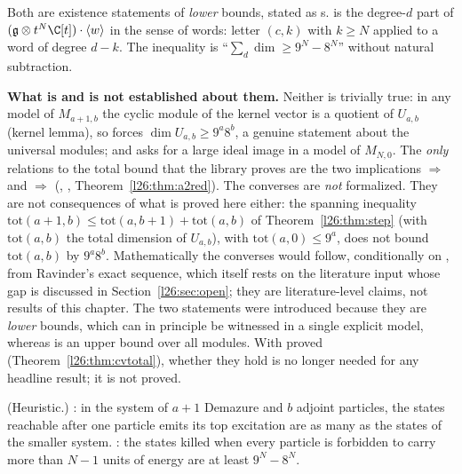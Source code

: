 \begin{dictionary}
Both are existence statements of \emph{lower} bounds, stated as s.  is the degree-$d$ part
of $(\ltwentysixg\otimes t^N\C[t])\cdot\langle w\rangle$ in the sense of words: letter $(c,k)$ with $k\ge N$ applied to a word of
degree $d-k$. The inequality  is ``$\sum_d\dim\ge9^N-8^N$'' without natural subtraction.

\textbf{What is and is not established about them.} Neither is trivially true: in any model of $M_{a+1,b}$ the cyclic
module of the kernel vector is a quotient of $U_{a,b}$ (kernel lemma), so  forces
$\dim U_{a,b}\ge9^a8^b$, a genuine statement about the universal modules; and  asks for a large ideal image
in a model of $M_{N,0}$. The \emph{only} relations to the total bound that the library proves are the two implications
 $\Rightarrow$  and  $\Rightarrow$ 
(, , Theorem~\ref{l26:thm:a2red}). The converses are
\emph{not} formalized. They are not consequences of what is proved here either: the spanning inequality
$\mathrm{tot}(a+1,b)\le\mathrm{tot}(a,b+1)+\mathrm{tot}(a,b)$ of Theorem~\ref{l26:thm:step} (with $\mathrm{tot}(a,b)$ the total dimension
of $U_{a,b}$), with $\mathrm{tot}(a,0)\le9^a$, does not bound $\mathrm{tot}(a,b)$ by $9^a8^b$. Mathematically
the converses would follow, conditionally on , from Ravinder's exact sequence, which itself rests on the
literature input whose gap is discussed in Section~\ref{l26:sec:open}; they are literature-level claims, not
results of this chapter. The two statements were introduced because they are \emph{lower} bounds, which can in principle be
witnessed in a single explicit model, whereas  is an upper bound over all modules. With
 proved (Theorem~\ref{l26:thm:cvtotal}), whether they hold is no longer needed for any headline result; it is
not proved.
\end{dictionary}

\begin{physics}
(Heuristic.) : in the system of $a+1$ Demazure and $b$ adjoint particles, the states reachable after one particle
emits its top excitation are as many as the states of the smaller system. : the states killed when every
particle is forbidden to carry more than $N-1$ units of energy are at least $9^N-8^N$.
\end{physics}


